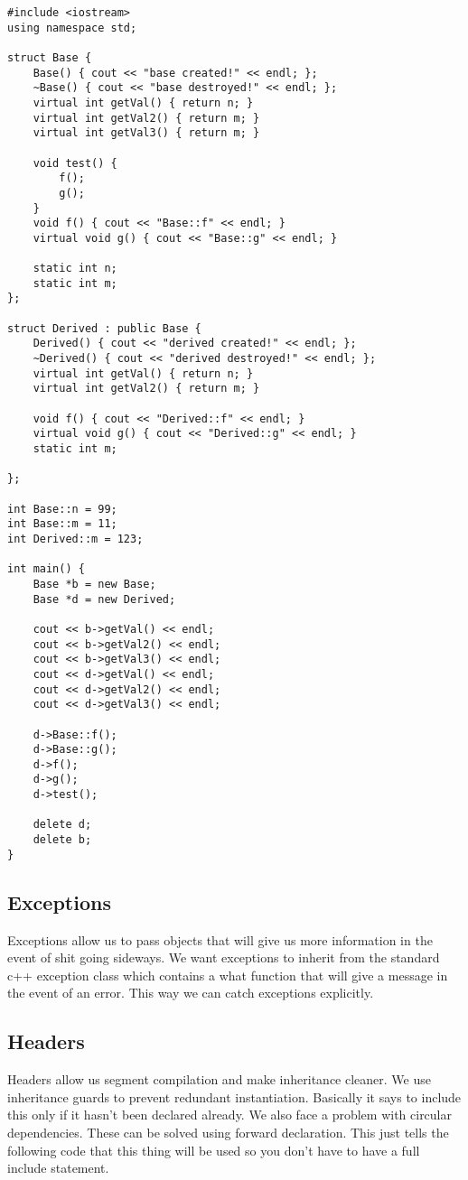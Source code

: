\documentclass[12pt]{article}
\begin{document}
\begin{lstlisting}
#include <iostream>
using namespace std;

struct Base {
    Base() { cout << "base created!" << endl; };
    ~Base() { cout << "base destroyed!" << endl; };
    virtual int getVal() { return n; }
    virtual int getVal2() { return m; }
    virtual int getVal3() { return m; }

    void test() {
        f();
        g();
    }
    void f() { cout << "Base::f" << endl; }
    virtual void g() { cout << "Base::g" << endl; }

    static int n;
    static int m;
};

struct Derived : public Base {
    Derived() { cout << "derived created!" << endl; };
    ~Derived() { cout << "derived destroyed!" << endl; };
    virtual int getVal() { return n; }
    virtual int getVal2() { return m; }

    void f() { cout << "Derived::f" << endl; }
    virtual void g() { cout << "Derived::g" << endl; }
    static int m;

};

int Base::n = 99;
int Base::m = 11;
int Derived::m = 123;

int main() {
    Base *b = new Base;
    Base *d = new Derived;

    cout << b->getVal() << endl;
    cout << b->getVal2() << endl;
    cout << b->getVal3() << endl;
    cout << d->getVal() << endl;
    cout << d->getVal2() << endl;
    cout << d->getVal3() << endl;

    d->Base::f();
    d->Base::g();
    d->f();
    d->g();
    d->test();

    delete d;
    delete b;
}
\end{lstlisting}

\subsection*{Exceptions}
Exceptions allow us to pass objects that will give us more information in the event of shit going sideways. We want exceptions to inherit from the standard c++ exception class which contains a what function that will give a message in the event of an error. This way we can catch exceptions explicitly.

\subsection*{Headers}
Headers allow us segment compilation and make inheritance cleaner. We use inheritance guards to prevent redundant instantiation. Basically it says to include this only if it hasn't been declared already. We also face a problem with circular dependencies. These can be solved using forward declaration. This just tells the following code that this thing will be used so you don't have to have a full include statement.
\end{document}
